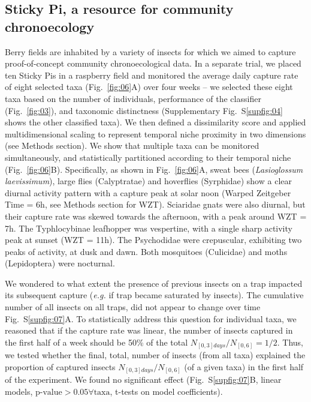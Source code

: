 \documentclass[12pt]{article}
\begin{document}
\begin{linenumbers}
		\subsection*{Sticky Pi, a resource for community chronoecology}
		
		Berry fields are inhabited by a variety of insects for which we aimed to capture proof-of-concept community chronoecological data. In a separate trial, we placed ten Sticky Pis in a raspberry field and monitored the average daily capture rate of eight selected taxa (Fig.~\ref{fig:06}A) over four weeks – we selected these eight taxa based on the number of individuals, performance of the classifier (Fig.~\ref{fig:03}), and taxonomic distinctness (Supplementary Fig.~S\ref{supfig:04} shows the other classified taxa). We then defined a dissimilarity score and applied multidimensional scaling to represent temporal niche proximity in two dimensions (see Methods section). We show that multiple taxa can be monitored simultaneously, and statistically partitioned according to their temporal niche (Fig.~\ref{fig:06}B). Specifically, as shown in Fig.~\ref{fig:06}A, sweat bees (\emph{Lasioglossum laevissimum}), large flies (Calyptratae) and hoverflies (Syrphidae) show a clear diurnal activity pattern with a capture peak at solar noon (Warped Zeitgeber Time = 6h, see Methods section for WZT). Sciaridae gnats were also diurnal, but their capture rate was skewed towards the afternoon, with a peak around WZT = 7h. The Typhlocybinae leafhopper was vespertine, with a single sharp activity peak at sunset (WZT = 11h). The Psychodidae were crepuscular, exhibiting two peaks of activity, at dusk and dawn. Both mosquitoes (Culicidae) and moths (Lepidoptera) were nocturnal. 		
		
        We wondered to what extent the presence of previous insects on a trap impacted its subsequent capture (\emph{e.g.} if trap became saturated by insects). The cumulative number of all insects on all traps, did not appear to change over time Fig.~S\ref{supfig:07}A. 
		To statistically address this question for individual taxa, we reasoned that if the capture rate was linear, the number of insects captured in the first half of a week should be 50\% of the total $N_{[0,3]days} / N_{[0, 6]} = 1/2$. 
		Thus, we tested whether the final, total, number of insects (from all taxa) explained the proportion of captured insects $N_{[0,3]days} / N_{[0,6]}$ (of a given taxa) in the first half of the experiment. 
		We found no significant effect (Fig.~S\ref{supfig:07}B, linear models, $\text{p-value} > 0.05 \forall \text{taxa}$,  t-tests on model coefficients).
		


\end{linenumbers}
\end{document}
